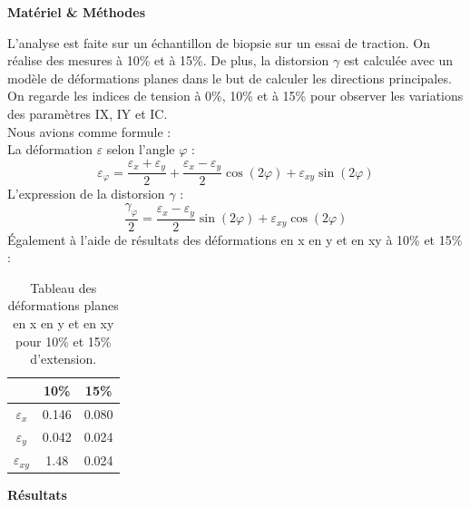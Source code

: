 \documentclass[a4paper,12pt]{article}
\begin{document}
\begin{center}
	\textbf{Matériel \& Méthodes}
\end{center}
L'analyse est faite sur un échantillon de biopsie sur un essai de traction. On réalise des mesures à 10\% et à 15\%. De plus, la distorsion $\gamma$ est calculée avec un modèle de déformations planes dans le but de calculer les directions principales. On regarde les indices de tension à 0\%, 10\% et à 15\% pour observer les variations des paramètres IX, IY et IC.
\bigskip
\\
Nous avions comme formule :\\
La déformation $\varepsilon$ selon l'angle $\varphi$ :
\begin{equation}
	\varepsilon_\varphi = \frac{\varepsilon_x + \varepsilon_y}{2} + \frac{\varepsilon_x - \varepsilon_y}{2} \cos(2\varphi) + \varepsilon_{xy} \sin(2\varphi)
	\label{eq:10}
\end{equation}
L'expression de la distorsion $\gamma$ :
\begin{equation}
	\frac{\gamma_\varphi}{2} = \frac{\varepsilon_x - \varepsilon_y}{2} \sin(2\varphi) + \varepsilon_{xy} \cos(2\varphi)
	\label{eq:11}
\end{equation}
Également à l'aide de résultats des déformations en x en y et en xy à 10\% et 15\% :\\


\begin{table}[h!]
	\centering
	\begin{tabular}{|c|c|c|}
		\hline
		& 10\% & 15\%  \\
		\hline
		$\varepsilon_x$     & 0.146  & 0.080  \\
		$\varepsilon_y$     & 0.042  & 0.024   \\
		$\varepsilon_{xy}$     & 1.48  & 0.024   \\
		\hline
	\end{tabular}
	\caption{Tableau des déformations planes en x en y et en xy pour 10\% et 15\% d'extension.}
	\label{tab:entetes}
\end{table}
\clearpage

\begin{center}
	\textbf{Résultats}
\end{center}
\end{document}
